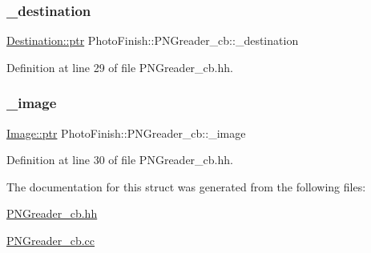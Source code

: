 \subsubsection{\texorpdfstring{\+\_\+destination}{\_destination}}
{\footnotesize\ttfamily \hyperlink{class_photo_finish_1_1_destination_a0d282a905cd81c3f0e6d7233c9bc7774}{Destination\+::ptr} Photo\+Finish\+::\+P\+N\+Greader\+\_\+cb\+::\+\_\+destination}



Definition at line 29 of file P\+N\+Greader\+\_\+cb.\+hh.

\mbox{\label{struct_photo_finish_1_1_p_n_greader__cb_a838629aed62fd760ea7f7630ebd5611c}} 
\subsubsection{\texorpdfstring{\+\_\+image}{\_image}}
{\footnotesize\ttfamily \hyperlink{class_photo_finish_1_1_image_ab336203305ed3a1397d7245063353b5a}{Image\+::ptr} Photo\+Finish\+::\+P\+N\+Greader\+\_\+cb\+::\+\_\+image}



Definition at line 30 of file P\+N\+Greader\+\_\+cb.\+hh.



The documentation for this struct was generated from the following files\+:\begin{DoxyCompactItemize}
\item 
\hyperlink{_p_n_greader__cb_8hh}{P\+N\+Greader\+\_\+cb.\+hh}\item 
\hyperlink{_p_n_greader__cb_8cc}{P\+N\+Greader\+\_\+cb.\+cc}\end{DoxyCompactItemize}
